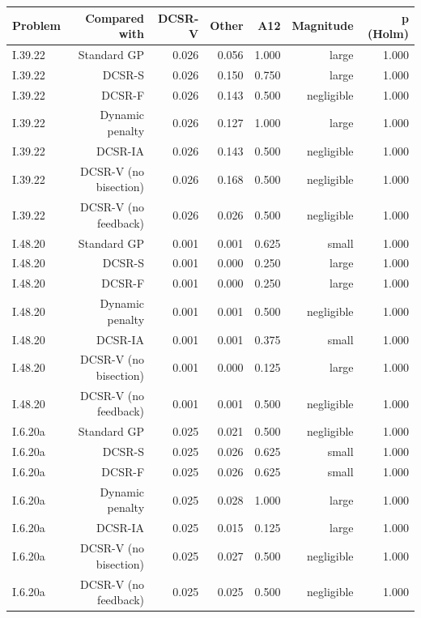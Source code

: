 \begin{tabular}{lrrrrrr}
\toprule
Problem & Compared with & DCSR-V & Other & A12 & Magnitude & p (Holm) \\
\midrule
I.39.22 & Standard GP & 0.026 & 0.056 & 1.000 & large & 1.000 \\
I.39.22 & DCSR-S & 0.026 & 0.150 & 0.750 & large & 1.000 \\
I.39.22 & DCSR-F & 0.026 & 0.143 & 0.500 & negligible & 1.000 \\
I.39.22 & Dynamic penalty & 0.026 & 0.127 & 1.000 & large & 1.000 \\
I.39.22 & DCSR-IA & 0.026 & 0.143 & 0.500 & negligible & 1.000 \\
I.39.22 & DCSR-V (no bisection) & 0.026 & 0.168 & 0.500 & negligible & 1.000 \\
I.39.22 & DCSR-V (no feedback) & 0.026 & 0.026 & 0.500 & negligible & 1.000 \\
I.48.20 & Standard GP & 0.001 & 0.001 & 0.625 & small & 1.000 \\
I.48.20 & DCSR-S & 0.001 & 0.000 & 0.250 & large & 1.000 \\
I.48.20 & DCSR-F & 0.001 & 0.000 & 0.250 & large & 1.000 \\
I.48.20 & Dynamic penalty & 0.001 & 0.001 & 0.500 & negligible & 1.000 \\
I.48.20 & DCSR-IA & 0.001 & 0.001 & 0.375 & small & 1.000 \\
I.48.20 & DCSR-V (no bisection) & 0.001 & 0.000 & 0.125 & large & 1.000 \\
I.48.20 & DCSR-V (no feedback) & 0.001 & 0.001 & 0.500 & negligible & 1.000 \\
I.6.20a & Standard GP & 0.025 & 0.021 & 0.500 & negligible & 1.000 \\
I.6.20a & DCSR-S & 0.025 & 0.026 & 0.625 & small & 1.000 \\
I.6.20a & DCSR-F & 0.025 & 0.026 & 0.625 & small & 1.000 \\
I.6.20a & Dynamic penalty & 0.025 & 0.028 & 1.000 & large & 1.000 \\
I.6.20a & DCSR-IA & 0.025 & 0.015 & 0.125 & large & 1.000 \\
I.6.20a & DCSR-V (no bisection) & 0.025 & 0.027 & 0.500 & negligible & 1.000 \\
I.6.20a & DCSR-V (no feedback) & 0.025 & 0.025 & 0.500 & negligible & 1.000 \\
\bottomrule
\end{tabular}
